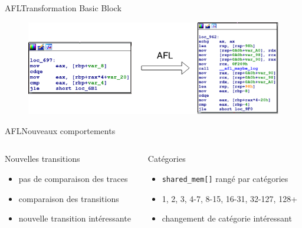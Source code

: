 \begin{frame}{AFL}{Transformation Basic Block}
  \begin{figure}
    \includegraphics[width=1.0\textwidth]{../medias/block_to_afl.png}
  \end{figure}
\end{frame}

\begin{frame}{AFL}{Nouveaux comportements}
  \begin{columns}
    \begin{column}{0.5\textwidth}
      \begin{exampleblock}{Nouvelles transitions}
        \begin{itemize}
          \item{pas de comparaison des traces}
          \item{comparaison des transitions}
          \item{nouvelle transition intéressante}
        \end{itemize}
        \vspace{1.25ex}
      \end{exampleblock}
    \end{column}

    \begin{column}{0.5\textwidth}
      \begin{exampleblock}{Catégories}
        \begin{itemize}
          \item{\lstinline{shared_mem[]} rangé par catégories}
          \item{1, 2, 3, 4-7, 8-15, 16-31, 32-127, 128+}
          \item{changement de catégorie intéressant}
        \end{itemize}
      \end{exampleblock}
    \end{column}
  \end{columns}

  \pause
  \hspace{50.5cm}


\end{frame}

